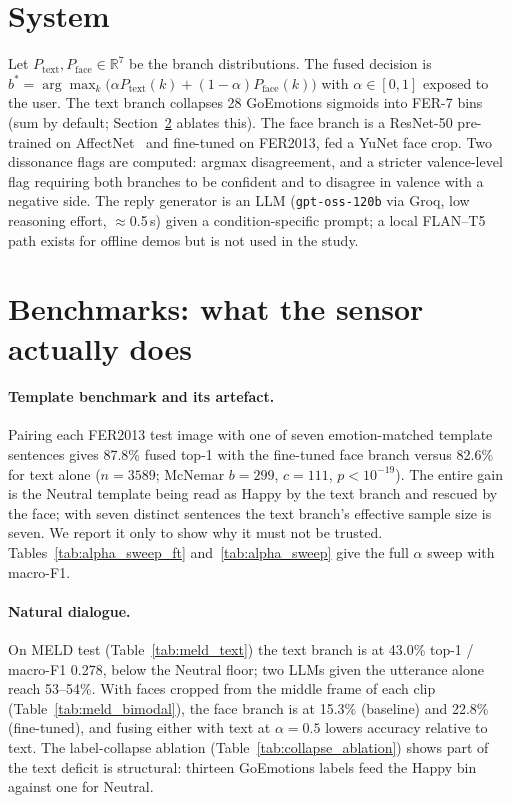 \documentclass[sigconf,nonacm]{acmart}
\begin{document}
\section{System}
Let $P_\text{text}, P_\text{face} \in \mathbb{R}^7$ be the branch distributions. The fused decision is $b^* = \arg\max_k \big(\alpha P_\text{text}(k) + (1-\alpha) P_\text{face}(k)\big)$ with $\alpha \in [0,1]$ exposed to the user. The text branch collapses 28 GoEmotions sigmoids into FER-7 bins (sum by default; Section~\ref{sec:bench} ablates this). The face branch is a ResNet-50 pre-trained on AffectNet~\cite{mollahosseini2019affectnet} and fine-tuned on FER2013, fed a YuNet face crop. Two dissonance flags are computed: argmax disagreement, and a stricter valence-level flag requiring both branches to be confident and to disagree in valence with a negative side. The reply generator is an LLM (\texttt{gpt-oss-120b} via Groq, low reasoning effort, $\approx$0.5\,s) given a condition-specific prompt; a local FLAN--T5 path exists for offline demos but is not used in the study.

\section{Benchmarks: what the sensor actually does}\label{sec:bench}
\paragraph{Template benchmark and its artefact.} Pairing each FER2013 test image with one of seven emotion-matched template sentences gives 87.8\% fused top-1 with the fine-tuned face branch versus 82.6\% for text alone ($n\!=\!3589$; McNemar $b\!=\!299$, $c\!=\!111$, $p\!<\!10^{-19}$). The entire gain is the Neutral template being read as Happy by the text branch and rescued by the face; with seven distinct sentences the text branch's effective sample size is seven. We report it only to show why it must not be trusted. Tables~\ref{tab:alpha_sweep_ft} and~\ref{tab:alpha_sweep} give the full $\alpha$ sweep with macro-F1.
\paragraph{Natural dialogue.} On MELD test (Table~\ref{tab:meld_text}) the text branch is at 43.0\% top-1 / macro-F1 0.278, below the Neutral floor; two LLMs given the utterance alone reach 53--54\%. With faces cropped from the middle frame of each clip (Table~\ref{tab:meld_bimodal}), the face branch is at 15.3\% (baseline) and 22.8\% (fine-tuned), and fusing either with text at $\alpha\!=\!0.5$ lowers accuracy relative to text. The label-collapse ablation (Table~\ref{tab:collapse_ablation}) shows part of the text deficit is structural: thirteen GoEmotions labels feed the Happy bin against one for Neutral.





\end{document}

